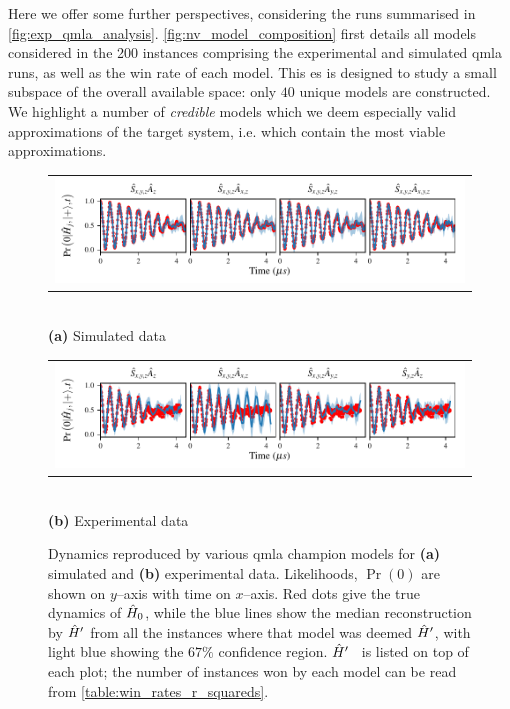 Here we offer some further perspectives, 
    considering the \glspl{run} summarised in \cref{fig:exp_qmla_analysis}.
\cref{fig:nv_model_composition} first details all models considered in the 200 \glspl{instance} 
    comprising the experimental and simulated \gls{qmla} \glspl{run}, 
    as well as the  \gls{win rate}  of each model. 
This \gls{es} is designed to study a small subspace of the overall available space:
    only $40$ unique models are constructed. 
We highlight a number of \emph{credible} models which we deem especially valid approximations of the target system, 
    i.e. which contain the most viable approximations. 
\par 

\begin{figure}[t]
    \centering
    \begin{tabular}{@{}c@{}}
        \includegraphics[scale=0.99]{experimental_study/figures/reproduced_dyamics_sim.pdf}
    \end{tabular}
    \\ \small \textbf{(a)} Simulated data
    \centering

    \begin{tabular}{@{}c@{}}
        \includegraphics[scale=0.99]{experimental_study/figures/reproduced_dyamics_exp.pdf}
    \end{tabular}
    \\ \small \textbf{(b)} Experimental data

    \caption[Dynamics reproduced by QMLA champion models for simulated/experimental data]{
        Dynamics reproduced by various \gls{qmla} \glspl{champion model} for \textbf{(a)} simulated and \textbf{(b)} experimental data. 
        Likelihoods, $\Pr(0)$ are shown on $y$--axis with time on $x$--axis. 
        Red dots give the true dynamics of $\hat{H}_0$, while the blue lines show the median reconstruction by $\hat{H}^{\prime}$
        from all the \glspl{instance} where that model was deemed $\hat{H}^{\prime}$, with light blue showing the $67\%$ confidence region.
        $\hat{H}^{\prime}$ \ is listed on top of each plot; the number of \glspl{instance} won by each model can be read from \cref{table:win_rates_r_squareds}.
        \figtableref 
        }
    \label{fig:nv_model_dynamics}
\end{figure}

